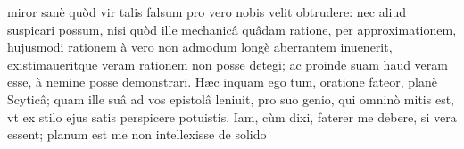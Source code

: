 \documentclass[11pt,a4paper]{article}
\begin{document}
miror sanè quòd vir talis falsum pro vero nobis velit obtrudere: nec aliud suspicari possum, nisi quòd ille mechanicâ quâdam ratione, per approximationem, hujusmodi rationem à vero non admodum longè aberrantem inuenerit, existimaueritque veram rationem non posse detegi; ac proinde suam haud veram esse, à nemine posse demonstrari. Hæc inquam ego tum, oratione fateor, planè Scyticâ; quam ille suâ ad vos epistolâ leniuit, pro suo genio, qui omninò mitis est, vt ex stilo ejus satis perspicere potuistis. Iam, cùm dixi, faterer me debere, si vera essent; planum est me non intellexisse de solido

\end{document}
